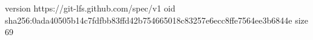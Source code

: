 version https://git-lfs.github.com/spec/v1
oid sha256:0ada40505b14c7fdfbb83ffd42b754665018c83257e6ecc8ffe7564ee3b6844e
size 69
